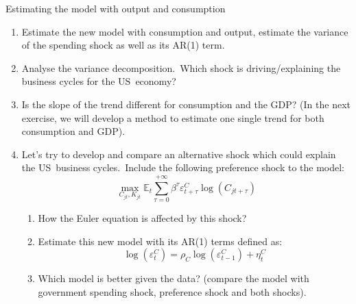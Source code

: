 \documentclass[a4paper,12pt]{article}%
\begin{document}
\begin{myexercise}{Estimating the model with output and consumption}
\begin{enumerate}
\item Estimate the new model with consumption and output, estimate the
variance of the spending shock as well as its AR(1) term.

\item Analyse the variance decomposition.\ Which shock is driving/explaining
the business cycles for the US\ economy?

\item Is the slope of the trend different for consumption and the GDP? (In the
next exercise, we will develop a method to estimate one single trend for both
consumption and GDP).

\item Let's try to develop and compare an alternative shock which could
explain the US\ business cycles.\ Include the following preference shock to
the model:%
\[
\max_{C_{jt},K_{jt}}\mathbb{E}_{t}\sum_{\tau=0}^{+\infty}\beta^{\tau
}\varepsilon_{t+\tau}^{C}\log\left(  C_{jt+\tau}\right)
\]


\begin{enumerate}
\item How the Euler equation is affected by this shock?

\item Estimate this new model with its AR(1) terms defined as:
\[
\log\left(  \varepsilon_{t}^{C}\right)  =\rho_{C}\log\left(  \varepsilon
_{t-1}^{C}\right)  +\eta_{t}^{C}%
\]


\item Which model is better given the data? (compare the model with government
spending shock, preference shock and both shocks).
\end{enumerate}
\end{enumerate}

%

\end{myexercise}%
\newpage%
\end{document}
